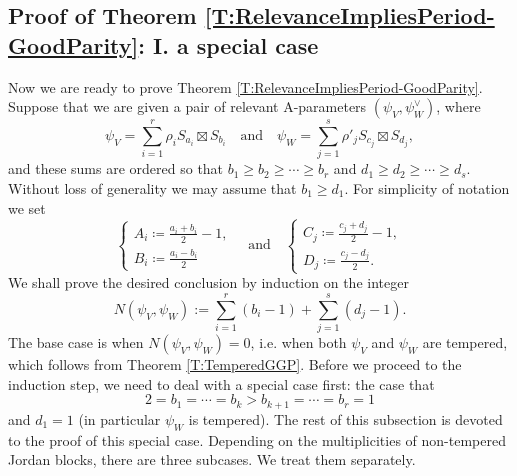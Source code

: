 \documentclass[11pt,letterpaper]{amsart}
\theoremstyle{plain}
\newcounter{theorem}[section]
\numberwithin{theorem}{section}
\numberwithin{equation}{subsection}
\theoremstyle{remark}
\begin{document}
\subsection{Proof of Theorem \ref{T:RelevanceImpliesPeriod-GoodParity}: I. a special case} %
\label{sub:proof_of_theorem_t:relevanceimpliesperiod-goodparity}

Now we are ready to prove Theorem \ref{T:RelevanceImpliesPeriod-GoodParity}. Suppose that we are given a pair of relevant A-parameters $\left(\psi_V,\psi_W^\vee\right)$, where
\[
    \psi_V = \sum_{i=1}^r \rho_i S_{a_i}\boxtimes S_{b_i} \quad \text{and} \quad \psi_W = \sum_{j=1}^s \rho'_j S_{c_j}\boxtimes S_{d_j},
\]
and these sums are ordered so that $b_1\geq b_2\geq \cdots\geq b_r$ and $d_1\geq d_2\geq \cdots\geq d_s$. Without loss of generality we may assume that $b_1\geq d_1$. For simplicity of notation we set 
\[
    \begin{cases}
       A_i \coloneqq \frac{a_i+b_i}{2}-1,\\
       B_i \coloneqq \frac{a_i-b_i}{2} 
    \end{cases}
    \quad\text{and}\quad
    \begin{cases}
      C_j \coloneqq \frac{c_j+d_j}{2}-1,\\
      D_j \coloneqq \frac{c_j-d_j}{2}.  
    \end{cases}
\]
We shall prove the desired conclusion by induction on the integer
\[
    N\left(\psi_V,\psi_W\right):=\sum^{r}_{i=1}\left(b_i-1\right)+\sum^{s}_{j=1}\left(d_j-1\right).
\]
The base case is when \(N\left(\psi_V,\psi_W\right)=0\), i.e. when both \(\psi_V\) and \(\psi_W\) are tempered, which follows from Theorem \ref{T:TemperedGGP}. Before we proceed to the induction step, we need to deal with a special case first: the case that
\[
    2=b_1=\cdots=b_k>b_{k+1}=\cdots=b_r=1
\]
and $d_1=1$ (in particular $\psi_W$ is tempered). The rest of this subsection is devoted to the proof of this special case. Depending on the multiplicities of non-tempered Jordan blocks, there are three subcases. We treat them separately.

\vskip 5pt
\end{document}
